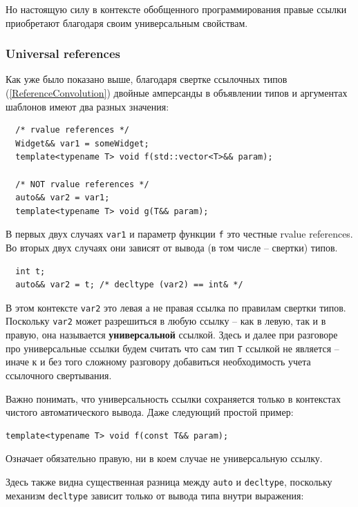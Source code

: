 \documentclass[a4paper,12pt,oneside]{article}
\begin{document}
Но настоящую силу в контексте обобщенного программирования правые ссылки приобретают благодаря своим универсальным свойствам.

\subsubsection{Universal references}\label{UniversalReferences}

Как уже было показано выше, благодаря свертке ссылочных типов (\ref{ReferenceConvolution}) двойные амперсанды в объявлении типов и аргументах шаблонов имеют два разных значения:

\begin{lstlisting}
  /* rvalue references */
  Widget&& var1 = someWidget; 
  template<typename T> void f(std::vector<T>&& param);
     
  /* NOT rvalue references */
  auto&& var2 = var1; 
  template<typename T> void g(T&& param);
\end{lstlisting}

В первых двух случаях \lstinline!var1! и параметр функции \lstinline!f! это честные rvalue references. Во вторых двух случаях они зависят от вывода (в том числе -- свертки) типов.

\begin{lstlisting}
  int t;
  auto&& var2 = t; /* decltype (var2) == int& */
\end{lstlisting}

В этом контексте \lstinline!var2! это левая а не правая ссылка по правилам свертки типов. Поскольку \lstinline!var2! может разрешиться в любую ссылку -- как в левую, так и в правую, она называется \textbf{универсальной} ссылкой. Здесь и далее при разговоре про универсальные ссылки будем считать что сам тип \lstinline!T! ссылкой не является -- иначе к и без того сложному разговору добавиться необходимость учета ссылочного свертывания.

Важно понимать, что универсальность ссылки сохраняется только в контекстах чистого автоматического вывода. Даже следующий простой пример:

\begin{lstlisting}
template<typename T> void f(const T&& param);
\end{lstlisting}

Означает обязательно правую, ни в коем случае не универсальную ссылку. 

Здесь также видна существенная разница между \lstinline!auto! и \lstinline!decltype!, поскольку механизм \lstinline!decltype! зависит только от вывода типа внутри выражения:
\end{document}
